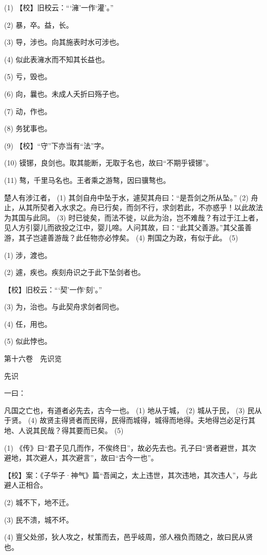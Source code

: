 \documentclass[12pt,UTF8]{ctexbook}
\begin{document}
(1) 【校】旧校云：“‘澭’一作‘灌’。”

(2) 暴，卒。益，长。

(3) 导，涉也。向其施表时水可涉也。

(4) 似此表澭水而不知其长益也。

(5) 亏，毁也。

(6) 向，曩也。未成人夭折曰殇子也。

(7) 动，作也。

(8) 务犹事也。

(9) 【校】“守”下亦当有“法”字。

(10) 镆铘，良剑也。取其能断，无取于名也，故曰“不期乎镆铘”。

(11) 骜，千里马名也。王者乘之游骜，因曰骥骜也。

楚人有涉江者， (1) 其剑自舟中坠于水，遽契其舟曰：“是吾剑之所从坠。” (2) 舟止，从其所契者入水求之。舟已行矣，而剑不行，求剑若此，不亦惑乎！以此故法为其国与此同。 (3) 时已徙矣，而法不徙，以此为治，岂不难哉？有过于江上者，见人方引婴儿而欲投之江中，婴儿啼。人问其故，曰：“此其父善游。”其父虽善游，其子岂遽善游哉？此任物亦必悖矣。 (4) 荆国之为政，有似于此。 (5)

(1) 涉，渡也。

(2) 遽，疾也。疾刻舟识之于此下坠剑者也。

【校】旧校云：“‘契’一作‘刻’。”

(3) 为，治也。与此契舟求剑者同也。

(4) 任，用也。

(5) 似此悖也。





第十六卷　先识览



先识


一曰：

凡国之亡也，有道者必先去，古今一也。 (1) 地从于城， (2) 城从于民， (3) 民从于贤。 (4) 故贤主得贤者而民得，民得而城得，城得而地得。夫地得岂必足行其地、人说其民哉？得其要而已矣。 (5)

(1) 《传》曰“君子见几而作，不俟终日”，故必先去也。孔子曰“贤者避世，其次避地，其次避人，其次避言”，故曰“古今一也”。

【校】案：《子华子·神气》篇“吾闻之，太上违世，其次违地，其次违人”，与此避人正相合。

(2) 城不下，地不迁。

(3) 民不溃，城不坏。

(4) 亶父处邠，狄人攻之，杖策而去，邑乎岐周，邠人襁负而随之，故曰民从贤也。
\end{document}
